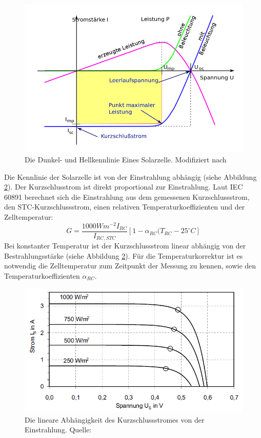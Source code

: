 \documentclass[a4paper,bibtotoc,oneside]{scrbook}
\begin{document}
\begin{figure}[htbp]
\centering
\includegraphics[width=125mm]{img/kennlinie.png}
\caption{Die Dunkel- und Hellkennlinie Eines Solarzelle. Modifiziert nach \cite{kl}}\label{kennlinie}
\end{figure}

Die Kennlinie der Solarzelle ist von der Einstrahlung abhängig (siehe Abbildung \ref{mpp}). Der Kurzschlusstrom ist direkt proportional zur Einstrahlung.
Laut IEC 60891 \cite{norm891} berechnet sich die Einstrahlung aus dem gemessenen Kurzschlussstrom, den STC-Kurzschlussstrom, einen relativen Temperaturkoeffizienten und der Zelltemperatur:
\begin{equation}
G = \frac{1000Wm^{-2}I_{RC}}{I_{RC,STC}} [1 - \alpha_{RC}(T_{RC}-25^{\circ} C]
\end{equation}
Bei konstanter Temperatur ist der Kurzschlussstrom linear abhängig von der Bestrahlungsstärke (siehe Abbildung \ref{mpp}).
Für die Temperaturkorrektur ist es notwendig die Zelltemperatur zum Zeitpunkt der Messung zu kennen, sowie den Temperaturkoeffizienten $\alpha_{RC}$. 

\begin{figure}[htbp]
\centering
\includegraphics[width=125mm]{img/kennlinien.png}
\caption{Die lineare Abhängigkeit des Kurzschlussstromes von der Einstrahlung. Quelle: \cite{pv}}\label{mpp}
\end{figure}
\end{document}
